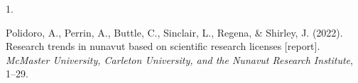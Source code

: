 \documentclass[10pt,a4paper,]{article}
\newcommand{\mystrut}{\rule[-.3\baselineskip]{0pt}{\baselineskip}}
\newlength{\csllabelwidth}
\newcommand{\CSLLeftMargin}[1]{\parbox[t]{\csllabelwidth}{#1}}
\newcommand{\CSLRightInline}[1]{\parbox[t]{\linewidth - \csllabelwidth}{#1}}
\begin{document}
\hypertarget{bibliography}{}
\leavevmode{}%
\CSLLeftMargin{1. }
\CSLRightInline{Polidoro, A., Perrin, A., Buttle, C., Sinclair, L.,
Regena, \& Shirley, J. (2022). Research trends in nunavut based on
scientific research licenses {[}report{]}. \emph{McMaster University,
Carleton University, and the Nunavut Research Institute}, 1--29.}



\null
\vspace*{\fill}
\hspace{-0.25\linewidth}\colorbox{white}{\makebox[1.5\linewidth][c]{\mystrut  \textnormal{- \textcolor{sectcol}{April
2022}


 - }}}

%
%
%
%
%
%
\end{document}
